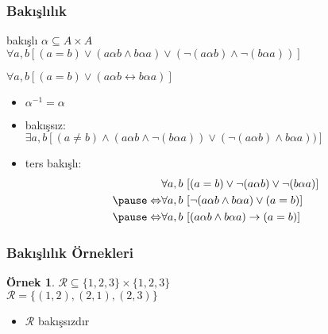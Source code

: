 \documentclass[dvipsnames]{beamer}
\theoremstyle{definition}
\theoremstyle{example}
\newtheorem{ornek}[theorem]{Örnek}
\theoremstyle{plain}
\begin{document}
\begin{frame}
  \frametitle{Bakışlılık}

  \begin{block}{bakışlı}
    $\alpha \subseteq A \times A$\\
    $\forall a,b [(a=b) \vee (a \alpha b \wedge b \alpha a)
                        \vee (\neg(a \alpha b) \wedge \neg(b \alpha a))]$

    \pause
    $\forall a,b [(a=b) \vee (a \alpha b \leftrightarrow b \alpha a)]$
  \end{block}

  \pause
  \begin{itemize}
    \item $\alpha^{-1} = \alpha$

    \pause
    \medskip
    \item bakışsız:\\
      $\exists a,b [(a \neq b) \wedge (a \alpha b \wedge \neg(b \alpha a))
                               \vee (\neg (a \alpha b) \wedge b \alpha a))]$

    \pause
    \item ters bakışlı:
    \begin{eqnarray*}
                      & \forall a,b~
                    [(a=b) \vee \neg(a \alpha b) \vee \neg(b \alpha a)]\\\pause
      \Leftrightarrow & \forall a,b~
                    [\neg(a \alpha b \wedge b \alpha a) \vee (a=b)]\\\pause
      \Leftrightarrow & \forall a,b~
                    [(a \alpha b \wedge b \alpha a) \rightarrow (a=b)]
    \end{eqnarray*}
  \end{itemize}
\end{frame}

\begin{frame}
  \frametitle{Bakışlılık Örnekleri}

  \begin{ornek}
    $\mathcal{R} \subseteq \{1,2,3\} \times \{1,2,3\}$\\
    $\mathcal{R} = \{(1,2), (2,1), (2,3)\}$

    \medskip
    \begin{itemize}
      \item $\mathcal{R}$ bakışsızdır
    \end{itemize}
  \end{ornek}
\end{frame}
\end{document}
